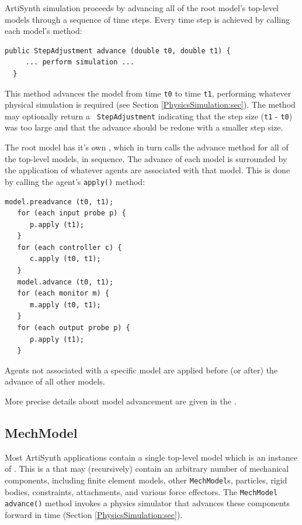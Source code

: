 ArtiSynth simulation proceeds by advancing all of the root model's
top-level models through a sequence of time steps. Every time
step is achieved by calling each model's 
 method:
\begin{lstlisting}[]
  public StepAdjustment advance (double t0, double t1) {
     ... perform simulation ...
  }
\end{lstlisting}
This method advances the model from time {\tt t0} to time {\tt t1},
performing whatever physical simulation is required (see Section
\ref{PhysicsSimulation:sec}). The method may optionally return a {\tt
StepAdjustment} indicating that the step size ({\tt t1} - {\tt t0}) was
too large and that the advance should be redone with a smaller step
size. 

The root model has it's own
, which in
turn calls the advance method for all of the top-level models, in
sequence. The advance of each model is surrounded by the application
of whatever 
agents are associated with that model. This is done
by calling the agent's {\tt apply()} method:
\begin{lstlisting}[]
   model.preadvance (t0, t1);
   for (each input probe p) {
      p.apply (t1);
   }
   for (each controller c) {
      c.apply (t0, t1);
   }
   model.advance (t0, t1);
   for (each monitor m) {
      m.apply (t0, t1);
   }
   for (each output probe p) {
      p.apply (t1);
   }
\end{lstlisting}
Agents not associated with a specific model are applied before (or
after) the advance of all other models.

More precise details about model advancement are given in the 
.

\subsection{MechModel}
\label{MechModel:sec}

Most ArtiSynth applications contain a single top-level model which is
an instance of .  This
is a\pdfbreak
{} that may
(recursively) contain an arbitrary number of mechanical components,
including finite element models, other {\tt MechModel}s, particles,
rigid bodies, constraints, attachments, and various force effectors.
The {\tt MechModel} {\tt advance()} method invokes a physics simulator
that advances these components forward in time (Section
\ref{PhysicsSimulation:sec}).


